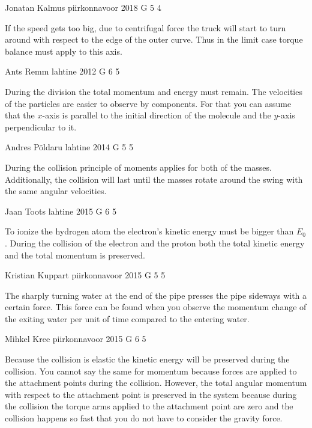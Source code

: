 \documentclass[11pt]{article}
\begin{document}
{Jonatan Kalmus} %
{piirkonnavoor} %
{2018} %
{G 5} %
{4} %
{

\ifEngHint
If the speed gets too big, due to centrifugal force the truck will start to turn around with respect to the edge of the outer curve. Thus in the limit case torque balance must apply to this axis.
\fi
}

{Ants Remm} %
{lahtine} %
{2012} %
{G 6} %
{5} %
{

\ifEngHint
During the division the total momentum and energy must remain. The velocities of the particles are easier to observe by components. For that you can assume that the $x$-axis is parallel to the initial direction of the molecule and the $y$-axis perpendicular to it.
\fi
}

{Andres Põldaru} %
{lahtine} %
{2014} %
{G 5} %
{5} %
{

\ifEngHint
During the collision principle of moments applies for both of the masses. Additionally, the collision will last until the masses rotate around the swing with the same angular velocities.
\fi
}

{Jaan Toots} %
{lahtine} %
{2015} %
{G 6} %
{5} %
{

\ifEngHint
To ionize the hydrogen atom the electron’s kinetic energy must be bigger than $E_0$. During the collision of the electron and the proton both the total kinetic energy and the total momentum is preserved.
\fi
}

{Kristian Kuppart} %
{piirkonnavoor} %
{2015} %
{G 5} %
{5} %
{

\ifEngHint
The sharply turning water at the end of the pipe presses the pipe sideways with a certain force. This force can be found when you observe the momentum change of the exiting water per unit of time compared to the entering water.
\fi
}

{Mihkel Kree} %
{piirkonnavoor} %
{2015} %
{G 6} %
{5} %
{

\ifEngHint
Because the collision is elastic the kinetic energy will be preserved during the collision. You cannot say the same for momentum because forces are applied to the attachment points during the collision. However, the total angular momentum with respect to the attachment point is preserved in the system because during the collision the torque arms applied to the attachment point are zero and the collision happens so fast that you do not have to consider the gravity force.
\fi
}
\end{document}

